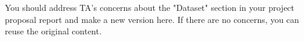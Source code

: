 You should address TA's concerns about the "Dataset" section in your project proposal report and make a new version here. If there are no concerns, you can reuse the original content.

